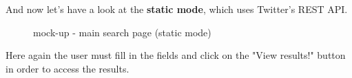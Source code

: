 \documentclass[a4paper,11pt]{report}
\begin{document}
\vspace*{\fill}
\newpage
\vspace*{\fill}
And now let's have a look at the \textbf{static mode}, which uses Twitter's REST API.
\begin{figure}[H]
\begin{center}
\caption{mock-up - main search page (static mode)}
\end{center}
\end{figure}
\vspace*{\fill}
\newpage
\vspace*{\fill}
Here again the user must fill in the fields and click on the "View results!" button in order to access the results.
\end{document}
